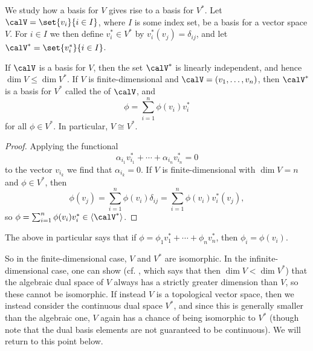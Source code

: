 We study how a basis for $V$ gives rise to a basis for $V^*$. Let $\calV = \set{v_i}{i \in I}$, where $I$ is some index set, be a basis for a vector space $V$. For $i \in I$ we then define $v_i^* \in V^*$ by $v_i^*(v_j) = \delta_{ij}$, and let $\calV^* = \set{v_i^*}{i \in I}$.

\begin{proposition}
    \label{prop:dual-basis}
    If $\calV$ is a basis for $V$, then the set $\calV^*$ is linearly independent, and hence $\dim V \leq \dim V^*$. If $V$ is finite-dimensional and $\calV = (v_1, \ldots, v_n)$, then $\calV^*$ is a basis for $V^*$ called the  of $\calV$, and
    \begin{equation*}
        \phi
            = \sum_{i=1}^n \phi(v_i) v_i^*
    \end{equation*}
    for all $\phi \in V^*$. In particular, $V \cong V^*$.
\end{proposition}

\begin{proof}
    Applying the functional
    \begin{equation*}
        \alpha_{i_1} v_{i_1}^* + \cdots + \alpha_{i_n} v_{i_n}^* = 0
    \end{equation*}
    to the vector $v_{i_k}$ we find that $\alpha_{i_k} = 0$. If $V$ is finite-dimensional with $\dim V = n$ and $\phi \in V^*$, then
    \begin{equation*}
        \phi(v_j)
            = \sum_{i=1}^n \phi(v_i) \delta_{ij}
            = \sum_{i=1}^n \phi(v_i) v_i^*(v_j),
    \end{equation*}
    so $\phi = \sum_{i=1}^n \phi(v_i) v_i^* \in \gen{\calV^*}$.
\end{proof}
%
The above in particular says that if $\phi = \phi_1 v_1^* + \cdots + \phi_n v_n^*$, then $\phi_i = \phi(v_i)$.

So in the finite-dimensional case, $V$ and $V^*$ are isomorphic. In the infinite-dimensional case, one can show (cf. \cite[Theorem~3.12]{romanlinalg}, which says that then $\dim V < \dim V^*$) that the algebraic dual space of $V$ always has a strictly greater dimension than $V$, so these cannot be isomorphic. If instead $V$ is a topological vector space, then we instead consider the continuous dual space $V^*$, and since this is generally smaller than the algebraic one, $V$ again has a chance of being isomorphic to $V^*$ (though note that the dual basis elements are not guaranteed to be continuous). We will return to this point below.



